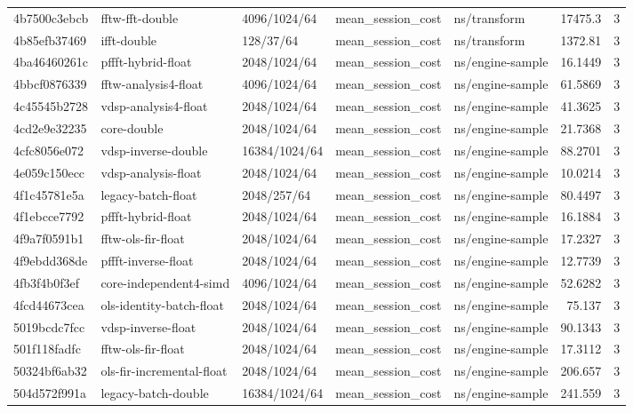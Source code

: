 \begin{longtable}{lllllrr}
4b7500c3ebcb & fftw-fft-double & 4096/1024/64 & mean\_session\_cost & ns/transform & 17475.3 & 3 \\
4b85efb37469 & ifft-double & 128/37/64 & mean\_session\_cost & ns/transform & 1372.81 & 3 \\
4ba46460261c & pffft-hybrid-float & 2048/1024/64 & mean\_session\_cost & ns/engine-sample & 16.1449 & 3 \\
4bbcf0876339 & fftw-analysis4-float & 4096/1024/64 & mean\_session\_cost & ns/engine-sample & 61.5869 & 3 \\
4c45545b2728 & vdsp-analysis4-float & 2048/1024/64 & mean\_session\_cost & ns/engine-sample & 41.3625 & 3 \\
4cd2e9e32235 & core-double & 2048/1024/64 & mean\_session\_cost & ns/engine-sample & 21.7368 & 3 \\
4cfc8056e072 & vdsp-inverse-double & 16384/1024/64 & mean\_session\_cost & ns/engine-sample & 88.2701 & 3 \\
4e059c150ecc & vdsp-analysis-float & 2048/1024/64 & mean\_session\_cost & ns/engine-sample & 10.0214 & 3 \\
4f1c45781e5a & legacy-batch-float & 2048/257/64 & mean\_session\_cost & ns/engine-sample & 80.4497 & 3 \\
4f1ebcce7792 & pffft-hybrid-float & 2048/1024/64 & mean\_session\_cost & ns/engine-sample & 16.1884 & 3 \\
4f9a7f0591b1 & fftw-ols-fir-float & 2048/1024/64 & mean\_session\_cost & ns/engine-sample & 17.2327 & 3 \\
4f9ebdd368de & pffft-inverse-float & 2048/1024/64 & mean\_session\_cost & ns/engine-sample & 12.7739 & 3 \\
4fb3f4b0f3ef & core-independent4-simd & 4096/1024/64 & mean\_session\_cost & ns/engine-sample & 52.6282 & 3 \\
4fcd44673cea & ols-identity-batch-float & 2048/1024/64 & mean\_session\_cost & ns/engine-sample & 75.137 & 3 \\
5019bcdc7fcc & vdsp-inverse-float & 2048/1024/64 & mean\_session\_cost & ns/engine-sample & 90.1343 & 3 \\
501f118fadfc & fftw-ols-fir-float & 2048/1024/64 & mean\_session\_cost & ns/engine-sample & 17.3112 & 3 \\
50324bf6ab32 & ols-fir-incremental-float & 2048/1024/64 & mean\_session\_cost & ns/engine-sample & 206.657 & 3 \\
504d572f991a & legacy-batch-double & 16384/1024/64 & mean\_session\_cost & ns/engine-sample & 241.559 & 3 \\

\end{longtable}
